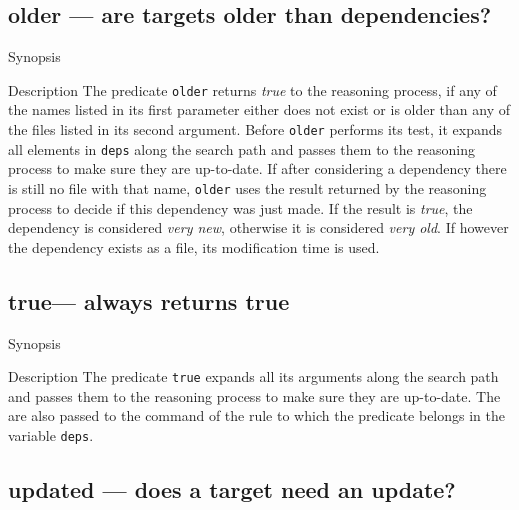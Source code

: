 \documentclass[11pt,bibtotoc,idxtotoc]{scrreprt}
\begin{document}
\subsection{older --- are targets older than dependencies?}
\label{pred:older}
\begin{Describe}
\item[Synopsis]  
\item[Description] The predicate \texttt{older} returns \textit{true}
  to the reasoning process, if any of the names listed in its first
  parameter either does not exist or is older than any of the files
  listed in its second argument. Before \texttt{older} performs its
  test, it expands all elements in \texttt{deps} along the search path
  and passes them to the reasoning process to make sure they are
  up-to-date. If after considering a dependency there is still no file
  with that name, \texttt{older} uses the result returned by the
  reasoning process to decide if this dependency was just made. If the
  result is \textit{true}, the dependency is considered \textit{very
    new}, otherwise it is considered \textit{very old}. If however the
  dependency exists as a file, its modification time is used.
\end{Describe}


\subsection{true--- always returns true}
\begin{Describe}
\item[Synopsis]  
\item[Description] The predicate \texttt{true} expands all its
  arguments along the search path and passes them to the reasoning
  process to make sure they are up-to-date. The are also passed to the
  command of the rule to which the predicate belongs in the variable
  \texttt{deps}.
\end{Describe}

\subsection{updated --- does a target need an update?}
\end{document}
